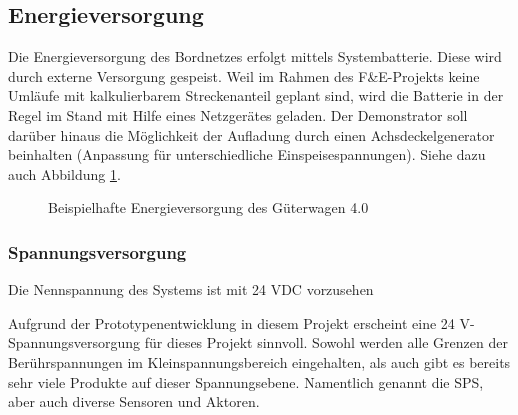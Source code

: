 \subsection{Energieversorgung}\label{sec:EV}
Die Energieversorgung des Bordnetzes erfolgt mittels Systembatterie. Diese wird durch externe Versorgung gespeist. Weil im Rahmen des F\&E-Projekts keine Umläufe mit kalkulierbarem Streckenanteil geplant sind, wird die Batterie in der Regel im Stand mit Hilfe eines Netzgerätes geladen. Der Demonstrator soll darüber hinaus die Möglichkeit der Aufladung durch einen Achsdeckelgenerator beinhalten (Anpassung für unterschiedliche Einspeisespannungen). Siehe dazu auch Abbildung \ref{fig:Soll-EV}. 
\begin{figure}[htp]
    \centering
    
    \caption{Beispielhafte Energieversorgung des Güterwagen 4.0}
    \label{fig:Soll-EV}
\end{figure}

\subsubsection{Spannungsversorgung}
\begin{feat}
Die Nennspannung des Systems ist mit 24 VDC vorzusehen
\end{feat}
\begin{rem}[zu Anf. 10]
Aufgrund der Prototypenentwicklung in diesem Projekt erscheint eine 24 V-Spannungsversorgung für dieses Projekt sinnvoll. Sowohl werden alle Grenzen der Berührspannungen im Kleinspannungsbereich eingehalten, als auch gibt es bereits sehr viele Produkte auf dieser Spannungsebene. Namentlich genannt die SPS, aber auch diverse Sensoren und Aktoren.
\end{rem}
